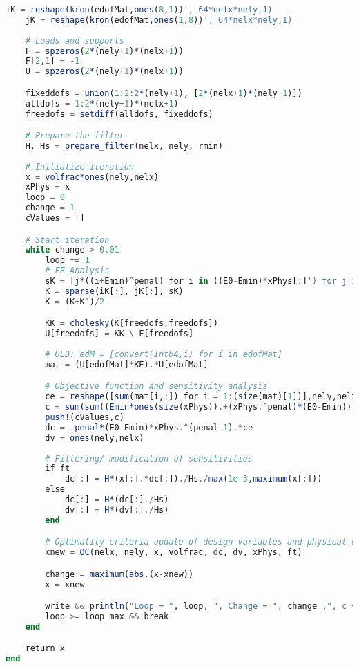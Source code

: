 \begin{lstlisting}[language=Julia, title=\texttt{top88.jl}, label={lst:top88}]
    iK = reshape(kron(edofMat,ones(8,1))', 64*nelx*nely,1)
    jK = reshape(kron(edofMat,ones(1,8))', 64*nelx*nely,1)
    
    # Loads and supports
    F = spzeros(2*(nely+1)*(nelx+1))
    F[2,1] = -1
    U = spzeros(2*(nely+1)*(nelx+1))

    fixeddofs = union(1:2:2*(nely+1), [2*(nelx+1)*(nely+1)])
    alldofs = 1:2*(nely+1)*(nelx+1)
    freedofs = setdiff(alldofs, fixeddofs)

    # Prepare the filter
    H, Hs = prepare_filter(nelx, nely, rmin)
    
    # Initialize iteration
    x = volfrac*ones(nely,nelx)
    xPhys = x
    loop = 0
    change = 1
    cValues = []

    # Start iteration
    while change > 0.01
        loop += 1
        # FE-Analysis
        sK = [j*((i+Emin)^penal) for i in ((E0-Emin)*xPhys[:]') for j in KE[:]]
        K = sparse(iK[:], jK[:], sK)
        K = (K+K')/2

        KK = cholesky(K[freedofs,freedofs])
        U[freedofs] = KK \ F[freedofs]
        
        # OLD: edM = [convert(Int64,i) for i in edofMat]
        mat = (U[edofMat]*KE).*U[edofMat]

        # Objective function and sensitivity analysis
        ce = reshape([sum(mat[i,:]) for i = 1:(size(mat)[1])],nely,nelx)
        c = sum(sum((Emin*ones(size(xPhys)).+(xPhys.^penal)*(E0-Emin)).*ce))
        push!(cValues,c)
        dc = -penal*(E0-Emin)*xPhys.^(penal-1).*ce
        dv = ones(nely,nelx)
        
        # Filtering/ modification of sensitivities
        if ft
            dc[:] = H*(x[:].*dc[:])./Hs./max(1e-3,maximum(x[:]))
        else
            dc[:] = H*(dc[:]./Hs)
            dv[:] = H*(dv[:]./Hs)
        end

        # Optimality criteria update of design variables and physical densities
        xnew = OC(nelx, nely, x, volfrac, dc, dv, xPhys, ft)

        change = maximum(abs.(x-xnew))
        x = xnew

        write && println("Loop = ", loop, ", Change = ", change ,", c = ", c, ", structural density = ", mean(x))
        loop >= loop_max && break       
    end

    return x
end



\end{lstlisting}
